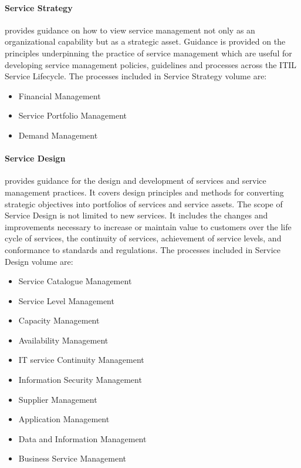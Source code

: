 \paragraph{\textbf{Service Strategy}} provides guidance on how to view service management not only as an organizational capability but as a strategic asset. Guidance is provided on the principles underpinning the practice of service management which are useful for developing service management policies, guidelines and processes across the ITIL Service Lifecycle.\cite{itilSS} The processes included in Service Strategy volume are:

\begin{itemize}
  \item Financial Management
  \item Service Portfolio Management 
  \item Demand Management
\end{itemize}

\paragraph{\textbf{Service Design}} provides guidance for the design and development of services and service management practices. It covers design principles and methods for converting strategic objectives into portfolios of services and service assets. The scope of Service Design is not limited to new services. It includes the changes and improvements necessary to increase or maintain value to customers over the life cycle of services, the continuity of services, achievement of service levels, and conformance to standards and regulations.\cite{itilSD} The processes included in Service Design volume are:

\begin{itemize}
  \item Service Catalogue Management
  \item Service Level Management 
  \item Capacity Management
  \item Availability Management
  \item IT service Continuity Management
  \item Information Security Management 
  \item Supplier Management
  \item Application Management
  \item Data and Information Management
  \item Business Service Management
\end{itemize} 

